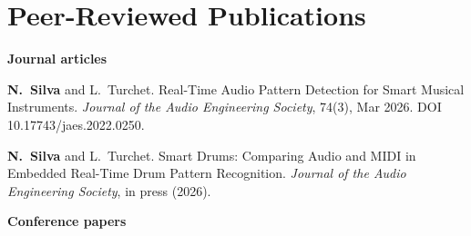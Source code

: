 \documentclass[11pt]{article}
\begin{document}
\section*{Peer-Reviewed Publications}
\textbf{Journal articles}
\begin{publist}[series=pub]
  \item \textbf{N.\ Silva} and L.\ Turchet. Real-Time Audio Pattern Detection for Smart Musical Instruments. \textit{Journal of the Audio Engineering Society}, 74(3), Mar 2026. DOI 10.17743/jaes.2022.0250.
  \item \textbf{N.\ Silva} and L.\ Turchet. Smart Drums: Comparing Audio and MIDI in Embedded Real-Time Drum Pattern Recognition. \textit{Journal of the Audio Engineering Society}, in press (2026).
\end{publist}
\textbf{Conference papers}
\end{document}
